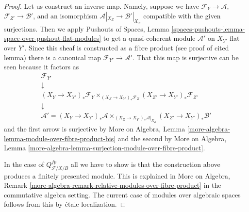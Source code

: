 \documentclass{stacks-project}
\theoremstyle{plain}
\theoremstyle{definition}
\theoremstyle{remark}
\numberwithin{equation}{subsection}
\begin{document}
\begin{proof}
Let us construct an inverse map. Namely, suppose we have
$\mathcal{F}_Y \to \mathcal{A}$,
$\mathcal{F}_{Z'} \to \mathcal{B}'$, and an isomorphism
$\mathcal{A}|_{X_Z} \to \mathcal{B}'|_{X_Z}$
compatible with the given surjections.
Then we apply Pushouts of Spaces, Lemma
\ref{spaces-pushouts-lemma-space-over-pushout-flat-modules}
to get a quasi-coherent module $\mathcal{A}'$ on $X_{Y'}$
flat over $Y'$. Since this sheaf is constructed as a fibre product
(see proof of cited lemma) there is a canonical map
$\mathcal{F}_{Y'} \to \mathcal{A}'$. That this map is surjective
can be seen because it factors as
$$
\begin{matrix}
\mathcal{F}_{Y'} \\
\downarrow \\
(X_Y \to X_{Y'})_*\mathcal{F}_Y
\times_{(X_Z \to X_{Y'})_*\mathcal{F}_Z}
(X_{Z'} \to X_{Y'})_*\mathcal{F}_{Z'} \\
\downarrow \\
\mathcal{A}' =
(X_Y \to X_{Y'})_*\mathcal{A}
\times_{(X_Z \to X_{Y'})_*\mathcal{A}|_{X_Z}}
(X_{Z'} \to X_{Y'})_*\mathcal{B}'
\end{matrix}
$$
and the first arrow is surjective by
More on Algebra, Lemma \ref{more-algebra-lemma-module-over-fibre-product-bis}
and the second by
More on Algebra, Lemma
\ref{more-algebra-lemma-surjection-module-over-fibre-product}.

\medskip\noindent
In the case of $Q^{fp}_{\mathcal{F}/X/B}$ all we have to show is that
the construction above produces a finitely presented module.
This is explained in
More on Algebra, Remark
\ref{more-algebra-remark-relative-modules-over-fibre-product}
in the commutative algebra setting. The current case of modules
over algebraic spaces follows from this
by \'etale localization.
\end{proof}
\end{document}
